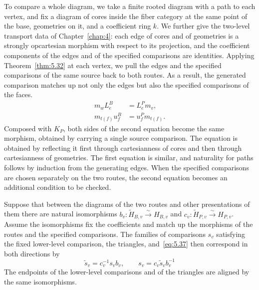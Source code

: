 To compare a whole diagram, we take a finite rooted diagram with a path to each vertex, and
fix a diagram of cores inside the fiber category at the same point of the base, geometries
on it, and a coefficient ring $k$. We further give the two-level transport data of
Chapter~\ref{chap:4}: each edge of cores and of geometries is a strongly opcartesian
morphism with respect to its projection, and the coefficient components of the edges and of
the specified comparisons are identities. Applying Theorem~\ref{thm:5.32} at each vertex,
we pull the edges and the specified comparisons of the same source back to both routes. As
a result, the generated comparison matches up not only the edges but also the specified
comparisons of the faces.
\begin{equation*}
\begin{aligned}
m_w L^B_e&=L^P_e m_v,\\
m_{t(f)}u^B_f&=u^P_fm_{t(f)}.
\end{aligned}
\tag{5.37}\label{eq:5.37}
\end{equation*}
Composed with $K_P$, both sides of the second equation become the same morphism, obtained by carrying
a single source comparison. The equation is obtained by reflecting it first through
cartesianness of cores and then through cartesianness of geometries. The first equation is
similar, and naturality for paths follows by induction from the generating edges. When the
specified comparisons are chosen separately on the two routes, the second equation becomes
an additional condition to be checked.

\begin{lemma}\label{lem:5.33}

Suppose that between the diagrams of the two routes and other presentations of them there
are natural isomorphisms
$b_v:\widetilde H_{B,v}\xrightarrow{\sim}H_{B,v}$ and
$c_v:\widetilde H_{P,v}\xrightarrow{\sim}H_{P,v}$.
Assume the isomorphisms fix the coefficients and match up the morphisms of the routes and
the specified comparisons. The families of comparisons $s_v$ satisfying the fixed
lower-level comparison, the triangles, and~\eqref{eq:5.37} then correspond in both
directions by
\begin{equation*}
\widetilde s_v=c_v^{-1}s_vb_v,
\qquad
s_v=c_v\widetilde s_vb_v^{-1}
\tag{5.38}\label{eq:5.38}
\end{equation*}
The endpoints of the lower-level comparisons and of the triangles are aligned by the same
isomorphisms.

\end{lemma}

